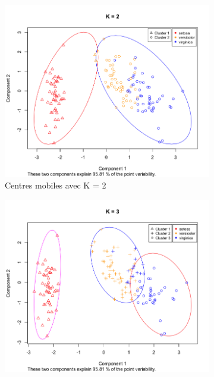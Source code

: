 \documentclass[a4paper,10pt]{report}
\begin{document}
\begin{figure}[H]
	\centering
	\captionsetup{justification=centering, margin=3cm}
	\begin{subfigure}[b]{0.33\linewidth}
		\centering
		\captionsetup{justification=centering}
		\includegraphics[width=1\linewidth]{img/3-1-1-iris-kmeans-2}
		\caption{\small Centres mobiles avec K = 2}
		\label{fig:3-1-1-iris-kmeans-2}
	\end{subfigure}%
	\begin{subfigure}[b]{0.33\linewidth}
		\centering
		\captionsetup{justification=centering}
		\includegraphics[width=1\linewidth]{img/3-1-1-iris-kmeans-3}

\end{subfigure}
\end{figure}
\end{document}
